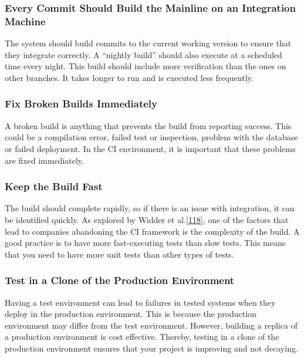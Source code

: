\documentclass[]{book}
\begin{document}
\subsubsection{Every Commit Should Build the Mainline on an Integration
Machine}\label{every-commit-should-build-the-mainline-on-an-integration-machine}

The system should build commits to the current working version to ensure
that they integrate correctly. A ``nightly build'' should also execute
at a scheduled time every night. This build should include more
verification than the ones on other branches. It takes longer to run and
is executed less frequently.

\subsubsection{Fix Broken Builds
Immediately}\label{fix-broken-builds-immediately}

A broken build is anything that prevents the build from reporting
success. This could be a compilation error, failed test or inspection,
problem with the database or failed deployment. In the CI environment,
it is important that these problems are fixed immediately.

\subsubsection{Keep the Build Fast}\label{keep-the-build-fast}

The build should complete rapidly, so if there is an issue with
integration, it can be identified quickly. As explored by Widder et
al.{[}\protect\hyperlink{ref-widder2018m}{118}{]}, one of the factors
that lead to companies abandoning the CI framework is the complexity of
the build. A good practice is to have more fast-executing tests than
slow tests. This means that you need to have more unit tests than other
types of tests.

\subsubsection{Test in a Clone of the Production
Environment}\label{test-in-a-clone-of-the-production-environment}

Having a test environment can lead to failures in tested systems when
they deploy in the production environment. This is because the
production environment may differ from the test environment. However,
building a replica of a production environment is cost effective.
Thereby, testing in a clone of the production environment ensures that
your project is improving and not decaying.
\end{document}
